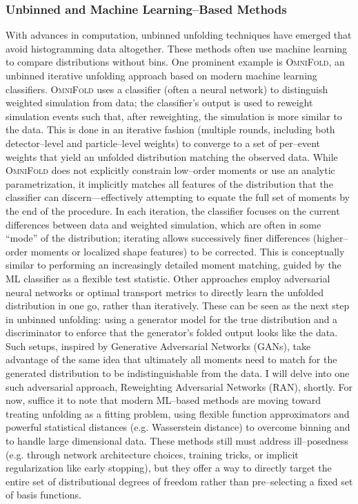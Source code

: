         \subsubsection{Unbinned and Machine Learning--Based Methods}
            With advances in computation, unbinned unfolding techniques have emerged that avoid histogramming data altogether.
            These methods often use machine learning to compare distributions without bins.
            One prominent example is \textsc{OmniFold},\kd{} an unbinned iterative unfolding approach based on modern machine learning classifiers.
            \textsc{OmniFold} uses a classifier (often a neural network) to distinguish weighted simulation from data; the classifier’s output is used to reweight simulation events such that, after reweighting, the simulation is more similar to the data.
            This is done in an iterative fashion (multiple rounds, including both detector--level and particle--level weights) to converge to a set of per--event weights that yield an unfolded distribution matching the observed data.\kd{}
            While \textsc{OmniFold} does not explicitly constrain low--order moments or use an analytic parametrization, it implicitly matches all features of the distribution that the classifier can discern---effectively attempting to equate the full set of moments by the end of the procedure.
            In each iteration, the classifier focuses on the current differences between data and weighted simulation, which are often in some “mode” of the distribution; iterating allows successively finer differences (higher--order moments or localized shape features) to be corrected.
            This is conceptually similar to performing an increasingly detailed moment matching, guided by the ML classifier as a flexible test statistic.
            Other approaches employ adversarial neural networks or optimal transport metrics to directly learn the unfolded distribution in one go, rather than iteratively.\kd{}
            These can be seen as the next step in unbinned unfolding: using a generator model for the true distribution and a discriminator to enforce that the generator’s folded output looks like the data.
            Such setups, inspired by Generative Adversarial Networks (GANs),\kd{} take advantage of the same idea that ultimately all moments need to match for the generated distribution to be indistinguishable from the data.
            I will delve into one such adversarial approach, Reweighting Adversarial Networks (RAN), shortly.
            For now, suffice it to note that modern ML--based methods are moving toward treating unfolding as a fitting problem, using flexible function approximators and powerful statistical distances (e.g. Wasserstein distance\kd{}) to overcome binning and to handle large dimensional data.
            These methods still must address ill--posedness (e.g. through network architecture choices, training tricks, or implicit regularization like early stopping), but they offer a way to directly target the entire set of distributional degrees of freedom rather than pre--selecting a fixed set of basis functions.
